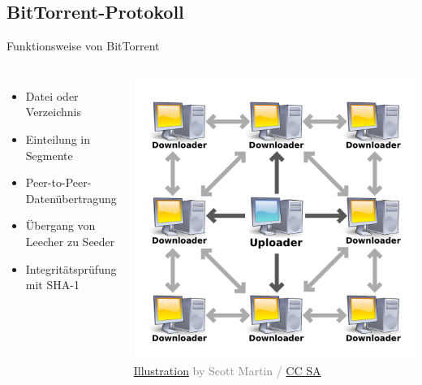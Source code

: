 \documentclass[dvipsnames]{beamer} %
\providecommand{\attribution}[4]{\textcolor{gray}{\tiny \href{#1}{Illustration} by #2 / \href{#3}{#4}}}
\begin{document}
	\subsection{BitTorrent-Protokoll}
	\begin{frame}{Funktionsweise von BitTorrent}
		\begin{columns}
			\begin{itemize}
				\item Datei oder Verzeichnis
				\item Einteilung in Segmente
				\item Peer-to-Peer-Datenübertragung
				\item Übergang von Leecher zu Seeder
				\item Integritätsprüfung mit SHA-1
			\end{itemize}
			\centering
	    \includegraphics[width=\textwidth]{001_BitTorrent_network}\\
	    \attribution{https://commons.wikimedia.org/wiki/File:BitTorrent_network.svg}{Scott Martin}{https://creativecommons.org/licenses/by-sa/3.0/deed.en}{CC SA}
		\end{columns}
	\end{frame}
\end{document}
